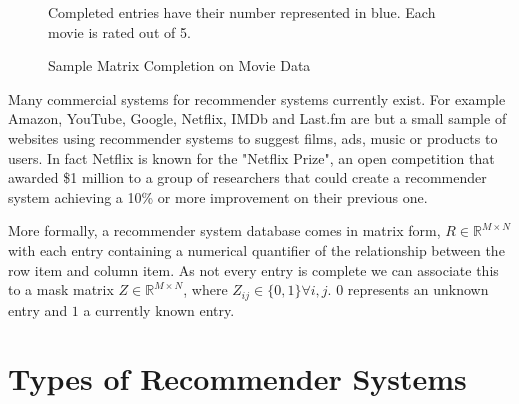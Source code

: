 \begin{figure}[!htbp]
\begin{center}
\end{center}
Completed entries have their number represented in blue. Each movie is rated out of 5.
    \caption{Sample Matrix Completion on Movie Data}
    \label{MatrixComp}
  
\end{figure}

Many commercial systems for recommender systems currently exist. For example Amazon, YouTube, Google, Netflix, IMDb and Last.fm are but a small sample of websites using recommender systems to suggest films, ads, music or products to users. In fact Netflix is known for the "Netflix Prize", an open competition that awarded \$1 million to a group of researchers that could create a recommender system achieving a 10\% or more improvement on their previous one.

More formally, a recommender system database comes in matrix form, $R \in \mathbb{R}^{M \times N}$ with each entry containing a numerical quantifier of the relationship between the row item and column item. As not every entry is complete we can associate this to a mask matrix $Z \in \mathbb{R}^{M \times N}$, where $Z_{ij} \in \{0,1\} \forall i,j$. $0$ represents an unknown entry and $1$ a currently known entry.





\section{Types of Recommender Systems}


